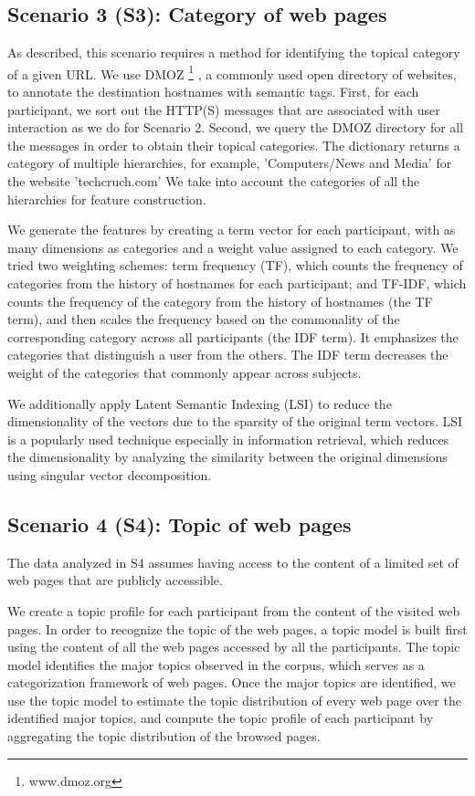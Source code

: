 \subsection{Scenario 3 (S3): Category of web pages}
As described, this scenario requires a method for identifying the topical category of a given URL. We use DMOZ
\footnote{www.dmoz.org}
, a commonly used open directory of websites, to annotate the destination hostnames with semantic tags. First, for each participant, we sort out the HTTP(S) messages that are associated with user interaction as we do for Scenario 2. Second, we query the DMOZ directory for all the messages in order to obtain their topical categories. The dictionary returns a category of multiple hierarchies, for example,  'Computers/News and Media' for the website 'techcruch.com' We take into account the categories of all the hierarchies for feature construction. 

We generate the features by creating a term vector for each participant, with as many dimensions as categories and a weight value assigned to each category. We tried two weighting schemes: term frequency (TF), which counts the frequency of categories from the history of hostnames for each participant; and TF-IDF, which counts the frequency of the category from the history of hostnames (the TF term), and then scales the frequency based on the commonality of the corresponding category across all participants (the IDF term). It emphasizes the categories that distinguish a user from the others. The IDF term decreases the weight of the categories that commonly appear across subjects. 

We additionally apply Latent Semantic Indexing (LSI) to reduce the dimensionality of the vectors due to the sparsity of the original term vectors. LSI is a popularly used technique especially in information retrieval, which reduces the dimensionality by analyzing the similarity between the original dimensions using singular vector decomposition. 

\subsection{Scenario 4 (S4): Topic of web pages}
The data analyzed in S4 assumes having access to the content of a limited set of web pages that are publicly accessible. 

We create a topic profile for each participant from the content of the visited web pages. In order to recognize the topic of the web pages, a topic model is built first using the content of all the web pages accessed by all the participants. The topic model identifies the major topics observed in the corpus, which serves as a categorization framework of web pages. Once the major topics are identified, we use the topic model to estimate the topic distribution of every web page over the identified major topics, and compute the topic profile of each participant by aggregating the topic distribution of the browsed pages. 

